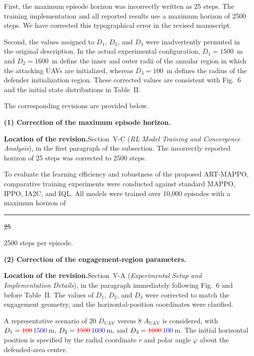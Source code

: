 \documentclass[11pt]{article}
\newcommand{\hladd}[1]{{\color{addblue}#1}}
\newcommand{\hldel}[1]{%
  {\color{red}%
   \ifmmode
     \sbox0{$#1$}%
     \rlap{\usebox0}%
     \rule[0.5\dimexpr\ht0-\dp0\relax]{\wd0}{0.6pt}%
   \else
     \sout{#1}%
   \fi}}
\newcommand{\loc}{\medskip\noindent\textbf{Location of the revision.}\quad}
\begin{document}
First, the maximum episode horizon was incorrectly written as 25 steps. The
training implementation and all reported results use a maximum horizon of
2500 steps. We have corrected this typographical error
in the revised manuscript.

Second, the values assigned to $D_1$, $D_2$, and $D_3$ were inadvertently
permuted in the original description. In the actual experimental
configuration, $D_1=1500$~m and $D_2=1600$~m define the inner and outer
radii of the annular region in which the attacking UAVs are initialized,
whereas $D_3=100$~m defines the radius of the defender initialization
region. These corrected values are consistent with Fig.~6 and the initial
state distributions in Table~II. 

The corresponding revisions are provided below.

\medskip
\noindent\textbf{(1) Correction of the maximum episode horizon.}

\loc Section~V-C (\emph{RL Model Training and Convergence Analysis}), in the
first paragraph of the subsection. The incorrectly reported horizon of 25
steps was corrected to 2500 steps.

\begin{tcolorbox}[enhanced,breakable,colback=white,colframe=addblue!55,
boxrule=0.6pt,arc=2pt,left=9pt,right=9pt,top=7pt,bottom=7pt]
To evaluate the learning efficiency and robustness of the proposed
ART-MAPPO, comparative training experiments were conducted against standard
MAPPO, IPPO, IA2C, and IQL. All models were trained over 10,000 episodes
with a maximum horizon of
\hldel{25} \hladd{2500}
steps per episode. 
\end{tcolorbox}

\medskip
\noindent\textbf{(2) Correction of the engagement-region parameters.}

\loc Section~V-A (\emph{Experimental Setup and Implementation Details}),
in the paragraph immediately following Fig.~6 and before Table~II. The
values of $D_1$, $D_2$, and $D_3$ were corrected to match the engagement
geometry, and the horizontal-position coordinates were clarified.

\begin{tcolorbox}[enhanced,breakable,colback=white,colframe=addblue!55,
boxrule=0.6pt,arc=2pt,left=9pt,right=9pt,top=7pt,bottom=7pt]
A representative scenario of 20 $D_{\mathrm{UAV}}$ versus 8
$A_{\mathrm{UAV}}$ is considered, with
$D_1=\hldel{100}\,\hladd{1500}$\,m,
$D_2=\hldel{1500}\,\hladd{1600}$\,m, and
$D_3=\hldel{1600}\,\hladd{100}$\,m.
\hladd{The initial horizontal position is specified by the radial coordinate
$r$ and polar angle $\varphi$ about the defended-area center.}
\end{tcolorbox}
\end{document}
